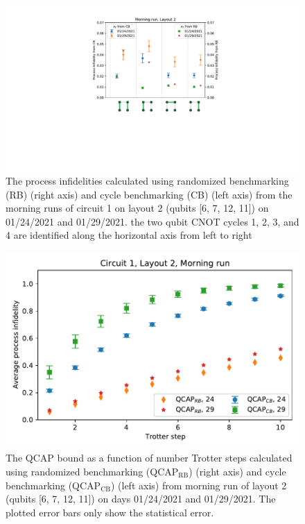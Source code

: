 \begin{figure}[htpb]
    \includegraphics[scale=0.5]{ProcessInfidelitiesCB_RB_plots_24_29_morning_L2.pdf}
    \caption{The process infidelities calculated using randomized benchmarking (RB) (right axis) and cycle benchmarking (CB) (left axis) from the morning runs of circuit 1 on layout 2 (qubits [6, 7, 12, 11]) on 01/24/2021 and 01/29/2021.  the two qubit CNOT cycles 1, 2, 3, and 4 are identified along the horizontal axis from left to right}
    \label{fig:processinfidelitiesStory4}
\end{figure}
  

\begin{figure}[htpb]
    \includegraphics[scale=0.56]{QCAP_CB_RB_Data_01_24_29_2021_Layout_2C1.pdf}
    \caption{The QCAP bound as a function of number Trotter steps calculated using randomized benchmarking (QCAP$_{\text{RB}}$) (right axis) and cycle benchmarking (QCAP$_{\text{CB}}$) (left axis) from morning run of layout 2 (qubits [6, 7, 12, 11]) on days 01/24/2021 and 01/29/2021. The plotted error bars only show the statistical error.}
    \label{fig:QCAPCB_RB_Story4}
\end{figure}



